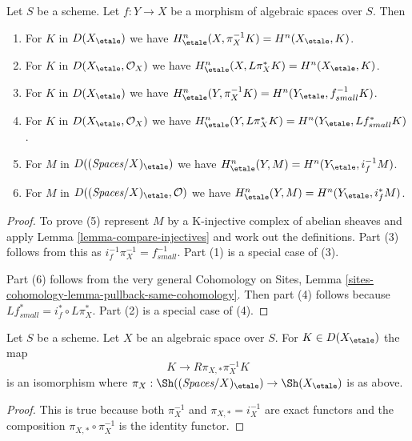 \begin{lemma}
\label{lemma-compare-cohommology}
Let $S$ be a scheme.
Let $f : Y \to X$ be a morphism of algebraic spaces over $S$. Then
\begin{enumerate}
\item For $K$ in $D(X_\etale)$ we have
$H^n_\etale(X, \pi_X^{-1}K) = H^n(X_\etale, K)$.
\item For $K$ in $D(X_\etale, \mathcal{O}_X)$ we have
$H^n_\etale(X, L\pi_X^*K) = H^n(X_\etale, K)$.
\item For $K$ in $D(X_\etale)$ we have
$H^n_\etale(Y, \pi_X^{-1}K) = H^n(Y_\etale, f_{small}^{-1}K)$.
\item For $K$ in $D(X_\etale, \mathcal{O}_X)$ we have
$H^n_\etale(Y, L\pi_X^*K) = H^n(Y_\etale, Lf_{small}^*K)$.
\item For $M$ in $D((\textit{Spaces}/X)_\etale)$ we have
$H^n_\etale(Y, M) = H^n(Y_\etale, i_f^{-1}M)$.
\item For $M$ in $D((\textit{Spaces}/X)_\etale, \mathcal{O})$ we have
$H^n_\etale(Y, M) = H^n(Y_\etale, i_f^*M)$.
\end{enumerate}
\end{lemma}

\begin{proof}
To prove (5) represent $M$ by a K-injective complex of abelian sheaves
and apply Lemma \ref{lemma-compare-injectives}
and work out the definitions. Part (3) follows from
this as $i_f^{-1}\pi_X^{-1} = f_{small}^{-1}$. Part (1) is a special
case of (3).

\medskip\noindent
Part (6) follows from the very general Cohomology on Sites, Lemma
\ref{sites-cohomology-lemma-pullback-same-cohomology}. Then part
(4) follows because $Lf_{small}^* = i_f^* \circ L\pi_X^*$.
Part (2) is a special case of (4).
\end{proof}

\begin{lemma}
\label{lemma-cohomological-descent-etale}
Let $S$ be a scheme. Let $X$ be an algebraic space over $S$.
For $K \in D(X_\etale)$ the map
$$
K \longrightarrow R\pi_{X, *}\pi_X^{-1}K
$$
is an isomorphism where
$\pi_X : \Sh((\textit{Spaces}/X)_\etale) \to \Sh(X_\etale)$ is as above.
\end{lemma}

\begin{proof}
This is true because both $\pi_X^{-1}$ and $\pi_{X, *} = i_X^{-1}$
are exact functors and the composition $\pi_{X, *} \circ \pi_X^{-1}$
is the identity functor.
\end{proof}

